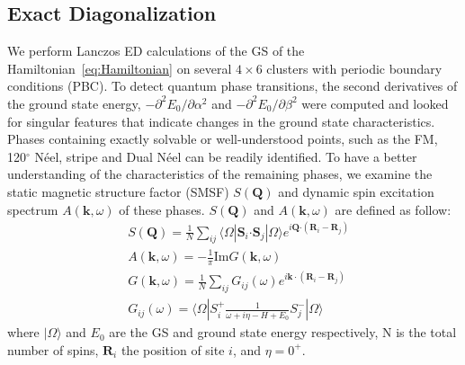\documentclass[aps,prb,reprint,amsfonts,amsmath,amssymb,showpacs,groupedaddress,superscriptaddress]{revtex4-1}
\begin{document}
\subsection{\label{sec:SectionIIB}Exact Diagonalization}
We perform Lanczos ED calculations of the GS of the Hamiltonian~\eqref{eq:Hamiltonian} on several $4 \times 6$ clusters with periodic boundary conditions (PBC). To detect quantum phase transitions, the second derivatives of the ground state energy, $-\partial^2E_0/\partial\alpha^2$ and $-\partial^2E_0/\partial\beta^2$ were computed and looked for singular features that indicate changes in the ground state characteristics. Phases containing exactly solvable or well-understood points, such as the FM, 120$^\circ$ N\'{e}el, stripe and Dual N\'{e}el can be readily identified. To have a better understanding of the characteristics of the remaining phases, we examine the static magnetic structure factor (SMSF) $S(\bm{Q})$ and dynamic spin excitation spectrum $A(\bm{k}, \omega)$ of these phases. $S(\bm{Q})$ and $A(\bm{k}, \omega)$ are defined as follow:
\begin{subequations}
    \begin{align}
        & S(\bm{Q}) = \frac{1}{N} \sum_{ij} \langle \Omega | \bm{S}_i \bm{\cdot} \bm{S}_j | \Omega \rangle e^{i \bm{Q} \bm{\cdot} (\bm{R}_i - \bm{R}_j)} \label{eq:SMSF} \\
        & A(\bm{k}, \omega) = -\frac{1}{\pi} \text{Im} G(\bm{k}, \omega) \label{eq:Akomega} \\
        & G(\bm{k}, \omega) = \frac{1}{N} \sum_{ij} G_{ij}(\omega) e^{i \bm{k} \cdot (\bm{R}_i - \bm{R}_j)} \\
        & G_{ij}(\omega) = \langle \Omega | S_i^{+} \frac{1}{\omega + i\eta - H + E_0} S_j^{-} | \Omega \rangle \label{eq:GreenFunction}
    \end{align}
\end{subequations}
where $| \Omega \rangle$ and $E_0$ are the GS and ground state energy respectively, N is the total number of spins, $\bm{R}_i$ the position of site $i$, and $\eta = 0^+$.
\end{document}
